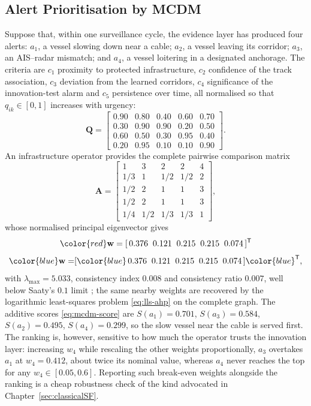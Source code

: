 \documentclass[graybox,envcountchap]{style/SNmono}
\providecommand{\DIFadd}[1]{{\protect\color{blue} #1}} %
\providecommand{\DIFdel}[1]{{\protect\color{red} #1}} %
\providecommand{\DIFaddbegin}{} %
\providecommand{\DIFaddend}{} %
\providecommand{\DIFdelbegin}{} %
\providecommand{\DIFdelend}{} %
\begin{document}
\subsection{Alert Prioritisation by MCDM}
\label{subsec:maritime-mcdm}
\begin{example}
\label{ex:ch07-maritime-mcdm}
Suppose that, within one surveillance cycle, the evidence layer has produced four alerts: $a_1$, a vessel slowing down near a cable; $a_2$, a vessel leaving its corridor; $a_3$, an AIS--radar mismatch; and $a_4$, a vessel loitering in a designated anchorage. The criteria are $c_1$ proximity to protected infrastructure, $c_2$ confidence of the track association, $c_3$ deviation from the learned corridors, $c_4$ significance of the innovation-test alarm and $c_5$ persistence over time, all normalised so that $q_{ik}\in[0,1]$ increases with urgency:
\begin{equation}
\mathbf{Q}=
\begin{bmatrix}
0.90 & 0.80 & 0.40 & 0.60 & 0.70\\
0.30 & 0.90 & 0.90 & 0.20 & 0.50\\
0.60 & 0.50 & 0.30 & 0.95 & 0.40\\
0.20 & 0.95 & 0.10 & 0.10 & 0.90
\end{bmatrix}.
\end{equation}
An infrastructure operator provides the complete pairwise comparison matrix
\begin{equation}
\mathbf{A}=
\begin{bmatrix}
1 & 3 & 2 & 2 & 4\\
1/3 & 1 & 1/2 & 1/2 & 2\\
1/2 & 2 & 1 & 1 & 3\\
1/2 & 2 & 1 & 1 & 3\\
1/4 & 1/2 & 1/3 & 1/3 & 1
\end{bmatrix},
\end{equation}
whose \DIFaddbegin \DIFadd{normalised }\DIFaddend principal eigenvector gives
\DIFdelbegin \[\DIFdel{\mathbf{w}=[\,0.376\;\;0.121\;\;0.215\;\;0.215\;\;0.074\,]^{\mathsf T}}\]\DIFdelend \DIFaddbegin \[\DIFadd{\mathbf{w}=}[\DIFadd{\,0.376\;\;0.121\;\;0.215\;\;0.215\;\;0.074\,}]\DIFadd{^{\mathsf T},}\]
\DIFaddend with $\lambda_{\max}=5.033$, consistency index $0.008$ and consistency ratio $0.007$, well below Saaty's $0.1$ limit \cite{saaty_analytic_1987}; \DIFdelbegin \DIFdel{the same }\DIFdelend \DIFaddbegin \DIFadd{nearby }\DIFaddend weights are recovered by the logarithmic least-squares problem \eqref{eq:lls-ahp} on the complete graph. The additive scores \eqref{eq:mcdm-score} are $S(a_1)=0.701$, $S(a_3)=0.584$, $S(a_2)=0.495$, $S(a_4)=0.299$, so the slow vessel near the cable is served first. The ranking is, however, sensitive to how much the operator trusts the innovation layer: increasing $w_4$ while rescaling the other weights proportionally, $a_3$ overtakes $a_1$ at $w_4=0.412$, about twice its nominal value, whereas $a_4$ never reaches the top for any $w_4\in[0.05,0.6]$. Reporting such break-even weights alongside the ranking is a cheap robustness check of the kind advocated in Chapter~\ref{sec:classicalSF}.
\end{example}
\end{document}
